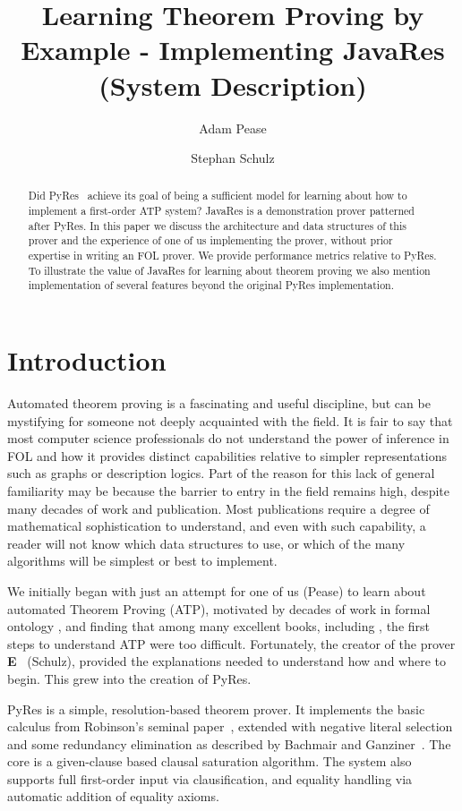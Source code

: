 \documentclass{llncs}
\title{Learning Theorem Proving by Example - Implementing JavaRes (System Description)}
\author{Adam Pease\inst{1}\orcid{0000-0001-9772-1266}
        \and Stephan Schulz\inst{2}\orcid{0000-0001-6262-8555}
  }
\institute{
  Articulate Software, USA,
  \email{\tt apease@articulatesoftware.com}
  \and
  DHBW Stuttgart, Germany,
  \email{\tt schulz@eprover.org}
}
\begin{document}
\maketitle


\begin{abstract}
  Did PyRes~\cite{SP:IJCAR-2020} achieve its goal of being a
  sufficient model for learning about how to implement a first-order
  ATP system?  JavaRes is a demonstration prover patterned after
  PyRes.  In this paper we discuss
  the architecture and data structures of this prover and the
  experience of one of us implementing the prover, without prior
  expertise in writing an FOL prover.  We provide performance metrics
  relative to PyRes.  To illustrate the
  value of JavaRes for learning about theorem proving we also mention
  implementation of several features beyond the original PyRes implementation.
\end{abstract}

\section{Introduction}

Automated theorem proving is a fascinating and useful discipline, but
can be mystifying for someone not deeply acquainted with the field.
It is fair to say that most computer science professionals do not
understand the power of inference in FOL and how it provides distinct
capabilities relative to simpler representations such as graphs or
description logics.  Part of the reason for this lack of general
familiarity may be because the barrier to entry in the field remains
high, despite many decades of work and publication.  Most publications
require a degree of mathematical sophistication to understand, and
even with such capability, a reader will not know which data
structures to use, or which of the many algorithms will be simplest or
best to implement.

We initially began with just an attempt for one of us (Pease) to learn
about automated Theorem Proving (ATP), motivated by decades of work in
formal ontology \cite{np01,p11}, and finding that among many excellent
books, including \cite{Harrison:HPL-2009}, the first steps to
understand ATP were too difficult.  Fortunately, the creator of the
prover \textbf{E}~\cite{Schulz:AICOM-2002,SCV:CADE-2019} (Schulz),
provided the explanations needed to understand how and where to begin.
This grew into the creation of PyRes.

PyRes is a simple, resolution-based theorem prover. It implements the
basic calculus from Robinson's seminal paper~\cite{Ro65}, extended
with negative literal selection and some redundancy elimination as
described by Bachmair and Ganziner~\cite{BG:HBAR-2001}. The core is a
given-clause based clausal saturation algorithm. The system also
supports full first-order input via clausification, and equality
handling via automatic addition of equality axioms.
\end{document}
